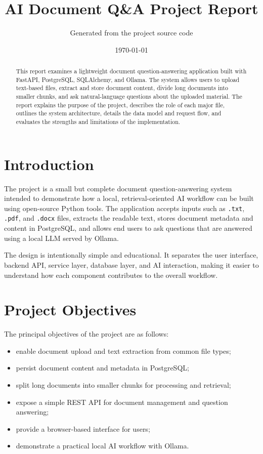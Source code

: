 ﻿\documentclass[11pt,a4paper]{article}
\begin{document}
\title{AI Document Q\&A Project Report}
\author{Generated from the project source code}
\date{\today}
\maketitle

\begin{abstract}
This report examines a lightweight document question-answering application built with FastAPI, PostgreSQL, SQLAlchemy, and Ollama. The system allows users to upload text-based files, extract and store document content, divide long documents into smaller chunks, and ask natural-language questions about the uploaded material. The report explains the purpose of the project, describes the role of each major file, outlines the system architecture, details the data model and request flow, and evaluates the strengths and limitations of the implementation.
\end{abstract}

\tableofcontents
\newpage

\section{Introduction}
The project is a small but complete document question-answering system intended to demonstrate how a local, retrieval-oriented AI workflow can be built using open-source Python tools. The application accepts inputs such as \texttt{.txt}, \texttt{.pdf}, and \texttt{.docx} files, extracts the readable text, stores document metadata and content in PostgreSQL, and allows end users to ask questions that are answered using a local LLM served by Ollama.

The design is intentionally simple and educational. It separates the user interface, backend API, service layer, database layer, and AI interaction, making it easier to understand how each component contributes to the overall workflow.

\section{Project Objectives}
The principal objectives of the project are as follows:
\begin{itemize}[leftmargin=*]
    \item enable document upload and text extraction from common file types;
    \item persist document content and metadata in PostgreSQL;
    \item split long documents into smaller chunks for processing and retrieval;
    \item expose a simple REST API for document management and question answering;
    \item provide a browser-based interface for users;
    \item demonstrate a practical local AI workflow with Ollama.
\end{itemize}
\end{document}

